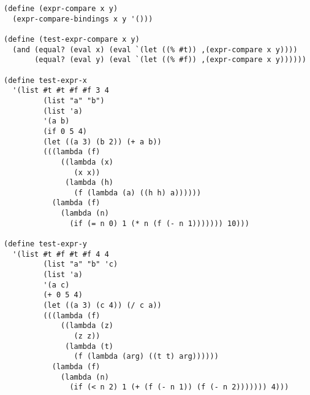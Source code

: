 \documentclass[8pt]{article}
\begin{document}
\begin{verbatim}
(define (expr-compare x y)
  (expr-compare-bindings x y '()))

(define (test-expr-compare x y)
  (and (equal? (eval x) (eval `(let ((% #t)) ,(expr-compare x y))))
       (equal? (eval y) (eval `(let ((% #f)) ,(expr-compare x y))))))

(define test-expr-x
  '(list #t #t #f #f 3 4
         (list "a" "b")
         (list 'a)
         '(a b)
         (if 0 5 4)
         (let ((a 3) (b 2)) (+ a b))
         (((lambda (f)
             ((lambda (x)
                (x x))
              (lambda (h)
                (f (lambda (a) ((h h) a))))))
           (lambda (f)
             (lambda (n)
               (if (= n 0) 1 (* n (f (- n 1))))))) 10)))

(define test-expr-y
  '(list #t #f #t #f 4 4
         (list "a" "b" 'c)
         (list 'a)
         '(a c)
         (+ 0 5 4)
         (let ((a 3) (c 4)) (/ c a))
         (((lambda (f)
             ((lambda (z)
                (z z))
              (lambda (t)
                (f (lambda (arg) ((t t) arg))))))
           (lambda (f)
             (lambda (n)
               (if (< n 2) 1 (+ (f (- n 1)) (f (- n 2))))))) 4)))
\end{verbatim}
\end{document}
